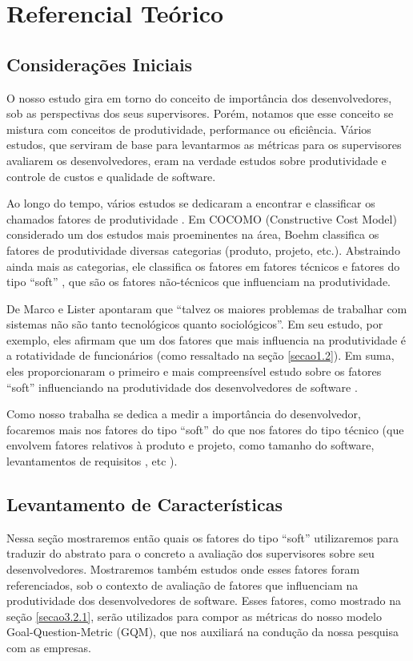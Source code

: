 \chapter[Referencial Teórico]{Referencial Teórico}

\section{Considerações Iniciais}
O nosso estudo gira em torno do conceito de importância dos desenvolvedores, sob as perspectivas dos seus supervisores. Porém, notamos que esse conceito se mistura com conceitos de produtividade, performance ou eficiência. Vários estudos, que serviram de base para levantarmos as métricas para os supervisores avaliarem os desenvolvedores, eram na verdade estudos sobre produtividade e controle de custos e qualidade de software.

Ao longo do tempo, vários estudos se dedicaram a encontrar e classificar os chamados fatores de produtividade \cite{Vosburgh1984, Walston1977,Brooks1981,Hanson1985,Jones1986,Boehm1988,Jones1997,Scudder1991,Banker1991,Boehm1984,Banker1987,Scacchi1995,Briand1998,Jones2000,Lokan2001,Clincy2003,Wagner2008,deBarrosSampaio2010}. Em COCOMO \cite{Boehm2000} (Constructive Cost Model) considerado um dos estudos mais proeminentes na área, Boehm classifica os fatores de produtividade diversas categorias (produto, projeto, etc.). Abstraindo ainda mais as categorias, ele classifica os fatores em fatores técnicos e fatores do tipo “soft” \cite{Wagner2008}, que são os fatores não-técnicos que influenciam na produtividade.

De Marco e Lister \cite{DeMarco1987} apontaram que “talvez os maiores problemas de trabalhar com sistemas não são tanto tecnológicos quanto sociológicos”. Em seu estudo, por exemplo, eles afirmam que um dos fatores que mais influencia na produtividade é a rotatividade de funcionários (como ressaltado na seção \ref{secao1.2}). Em suma, eles proporcionaram o primeiro e mais compreensível estudo sobre os fatores “soft” influenciando na produtividade dos desenvolvedores de software \cite{Wagner2008}.

Como nosso trabalha se dedica a medir a importância do desenvolvedor, focaremos mais nos fatores do tipo “soft” do que nos fatores do tipo técnico (que envolvem fatores relativos à produto e projeto, como tamanho do software, levantamentos de requisitos , etc \cite{deBarrosSampaio2010}).

\section{Levantamento de Características}
Nessa seção mostraremos então quais os fatores do tipo “soft” utilizaremos para traduzir do abstrato para o concreto a avaliação dos supervisores sobre seu desenvolvedores. Mostraremos também estudos onde esses fatores foram referenciados, sob o contexto de avaliação de fatores que influenciam na produtividade dos desenvolvedores de software. Esses fatores, como mostrado na seção \ref{secao3.2.1}, serão utilizados para compor as métricas do nosso modelo Goal-Question-Metric (GQM), que nos auxiliará na condução da nossa pesquisa com as empresas. 

